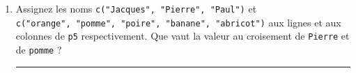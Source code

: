 \documentclass[12pt,twosided, notitlepage]{book}
\newenvironment{Shaded}{}{}
\newcommand{\KeywordTok}[1]{\textcolor[rgb]{0.00,0.00,1.00}{#1}}
\newcommand{\DataTypeTok}[1]{#1}
\newcommand{\DecValTok}[1]{#1}
\newcommand{\StringTok}[1]{\textcolor[rgb]{0.00,0.50,0.50}{#1}}
\newcommand{\CommentTok}[1]{\textcolor[rgb]{0.00,0.50,0.00}{#1}}
\newcommand{\OperatorTok}[1]{#1}
\newcommand{\NormalTok}[1]{#1}
\newif \ifsol
\renewenvironment{Shaded}{\begin{snugshade}}{\end{snugshade}}
\begin{document}
\begin{enumerate}
  \ifsol 

  \begin{center} \rule{0.5\linewidth}{\linethickness}\end{center}

\begin{Shaded}
\begin{Highlighting}[]
\CommentTok{# Création de p5}
\NormalTok{p5 <-}\StringTok{ }\KeywordTok{matrix}\NormalTok{(}\DecValTok{15}\OperatorTok{:}\DecValTok{1}\NormalTok{, }\DataTypeTok{nrow =} \DecValTok{3}\NormalTok{)}
\NormalTok{p5}
\NormalTok{  ##      [,1] [,2] [,3] [,4] [,5]}
\NormalTok{  ## [1,]   15   12    9    6    3}
\NormalTok{  ## [2,]   14   11    8    5    2}
\NormalTok{  ## [3,]   13   10    7    4    1}

\CommentTok{# Sélection des éléments demandés}
\NormalTok{p5[}\DecValTok{1}\NormalTok{, }\DecValTok{4}\NormalTok{]}
\NormalTok{  ## [1] 6}
\NormalTok{p5[}\DecValTok{3}\NormalTok{, ]}
\NormalTok{  ## [1] 13 10  7  4  1}
\NormalTok{p5[, }\DecValTok{2}\NormalTok{]}
\NormalTok{  ## [1] 12 11 10}

\NormalTok{p5[}\KeywordTok{c}\NormalTok{(}\DecValTok{1}\NormalTok{, }\DecValTok{2}\NormalTok{), }\KeywordTok{c}\NormalTok{(}\DecValTok{3}\NormalTok{, }\DecValTok{4}\NormalTok{)]}
\NormalTok{  ##      [,1] [,2]}
\NormalTok{  ## [1,]    9    6}
\NormalTok{  ## [2,]    8    5}
\CommentTok{# Taper p5[c(1, 2), c(3, 4)] permet de sélectionner}
\CommentTok{# une sous-matrice définie par les lignes 1 et 2}
\CommentTok{# d'une part et les colonnes 3 et 4 d'autre part.}
\end{Highlighting}
\end{Shaded}

  \begin{center} \rule{0.5\linewidth}{\linethickness}\end{center}

  \bigskip  \fi 
\item
  Assignez les noms \texttt{c("Jacques",\ "Pierre",\ "Paul")} et
  \texttt{c("orange",\ "pomme",\ "poire",\ "banane",\ "abricot")} aux
  lignes et aux colonnes de \texttt{p5}
  respectivement\index{\texttt{[}}. Que vaut la valeur au croisement de
  \texttt{Pierre} et de \texttt{pomme} ?

  \ifsol 

  \begin{center} \rule{0.5\linewidth}{\linethickness}\end{center}


\end{enumerate}
\end{document}
